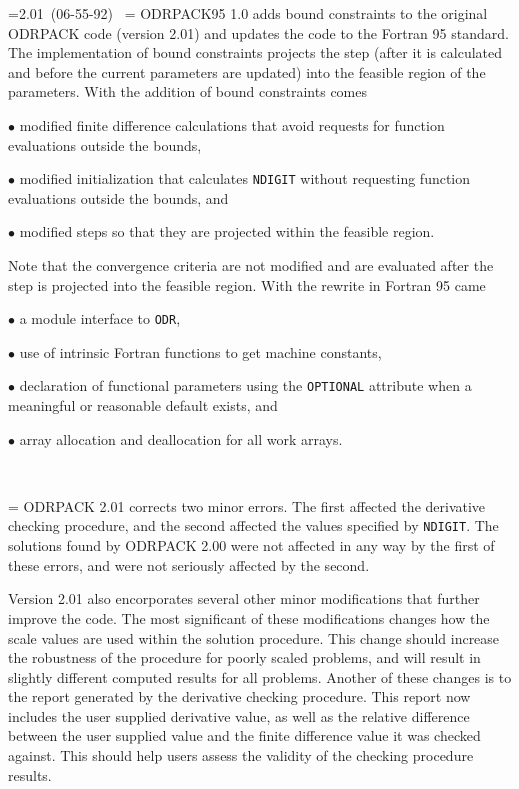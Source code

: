 \setbox\mybox=\hbox{2.01 (06-55-92) }
 \hangindent=\wd\mybox{} ODRPACK95 1.0 
adds bound constraints to the
original ODRPACK code (version 2.01) and updates the code to the Fortran
95 standard.  The implementation of bound constraints projects the step
(after it is calculated and before the current parameters are updated)
into the feasible region of the parameters.  With the addition of bound
constraints comes

\aligntobox $\bullet$ modified finite difference calculations that avoid
requests for function evaluations outside the bounds, 

\aligntobox $\bullet$ modified initialization that calculates {\tt NDIGIT} 
without requesting function evaluations outside the bounds, and 

\aligntobox $\bullet$ modified steps so that they are projected within the feasible region.

\aligntobox
Note that the convergence criteria are not modified and are evaluated after the
step is projected into the feasible region.  With the rewrite in Fortran 95 came

\aligntobox $\bullet$ a module interface to {\tt ODR},

\aligntobox $\bullet$ use of intrinsic Fortran functions to get machine constants,

\aligntobox $\bullet$ declaration of functional parameters using the {\tt OPTIONAL} attribute
when a meaningful or reasonable default exists, and

\aligntobox $\bullet$ array allocation and deallocation for all work arrays.
\
\vfil
\eject

\
\vskip 1.4in
\def\thissection{Original ODRPACK Revision History}
\bigskip\bigskip

\noindent{2.01 (06-19-92) }\hangindent=\wd\mybox\hangafter=1 ODRPACK 2.01 corrects two minor errors. The first affected the derivative checking procedure, and the second affected the values specified by {\tt NDIGIT}. The solutions found by ODRPACK 2.00 were not affected in any way by the first of these errors, and were not seriously affected by the second.

\aligntobox Version 2.01 also encorporates several other minor modifications that further improve the code. The most significant of these modifications changes how the scale values are used within the solution procedure. This change should increase the robustness of the procedure for poorly scaled problems, and will result in slightly different computed results for all problems. Another of these changes is to the report generated by the derivative checking procedure. This report now includes the user supplied derivative value, as well as the relative difference between the user supplied value and the finite difference value it was checked against. This should help users assess the validity of the checking procedure results.

